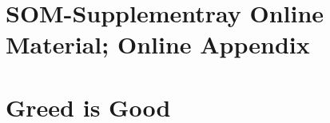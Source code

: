 \documentclass[10pt, letterpaper]{article}
\begin{document}
\begin{spacing}{1.8}
    






\section*{\Huge SOM-Supplementray Online Material; Online Appendix}


\section{Greed is Good}


\end{spacing}
\end{document}
